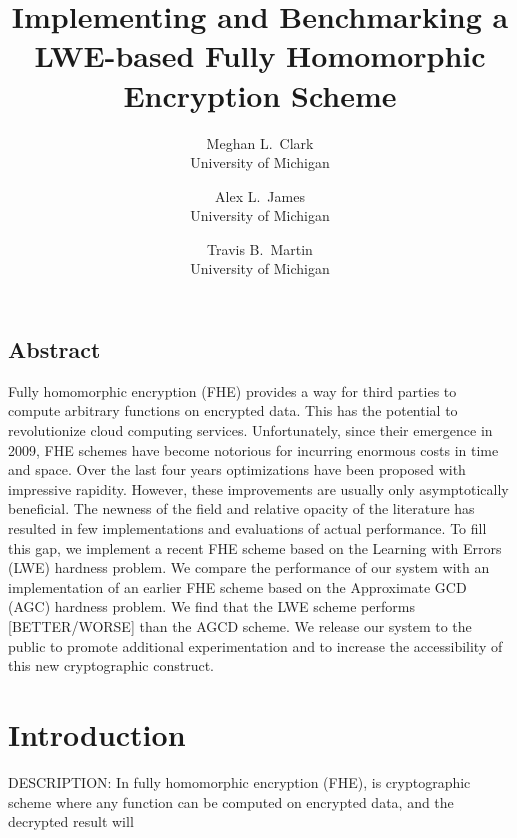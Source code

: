 \documentclass[letterpaper,twocolumn,10pt]{article}
\begin{document}
\date{}

\title{\Large \bf Implementing and Benchmarking a LWE-based Fully Homomorphic Encryption Scheme}

\author{
{\rm Meghan L.\ Clark}\\
University of Michigan
\and
{\rm Alex L.\ James}\\
University of Michigan
\and
{\rm Travis B.\ Martin}\\
University of Michigan
} %

\maketitle



\subsection*{Abstract}
Fully homomorphic encryption (FHE) provides a way for third parties to compute arbitrary functions on encrypted data. This has the potential to revolutionize cloud computing services. Unfortunately, since their emergence in 2009, FHE schemes have become notorious for incurring enormous costs in time and space. Over the last four years optimizations have been proposed with impressive rapidity. However, these improvements are usually only asymptotically beneficial. The newness of the field and relative opacity of the literature has resulted in few implementations and evaluations of actual performance. To fill this gap, we implement a recent FHE scheme based on the Learning with Errors (LWE) hardness problem. We compare the performance of our system with an implementation of an earlier FHE scheme based on the Approximate GCD (AGC) hardness problem. We find that the LWE scheme performs [BETTER/WORSE] than the AGCD scheme. We release our system to the public to promote additional experimentation and to increase the accessibility of this new cryptographic construct.


\section{Introduction}
DESCRIPTION: In fully homomorphic encryption (FHE), is cryptographic scheme where any function can be computed on encrypted data, and the decrypted result will 
\end{document}
